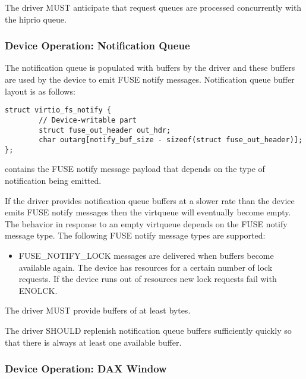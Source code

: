 The driver MUST anticipate that request queues are processed concurrently with the hiprio queue.

\subsubsection{Device Operation: Notification Queue}\label{sec:Device Types / File System Device / Device Operation / Device Operation: Notification Queue}

The notification queue is populated with buffers by the driver and these
buffers are used by the device to emit FUSE notify messages.  Notification
queue buffer layout is as follows:

\begin{lstlisting}
struct virtio_fs_notify {
        // Device-writable part
        struct fuse_out_header out_hdr;
        char outarg[notify_buf_size - sizeof(struct fuse_out_header)];
};
\end{lstlisting}

 contains the FUSE notify message payload that depends on the
type of notification being emitted.

If the driver provides notification queue buffers at a slower rate than the
device emits FUSE notify messages then the virtqueue will eventually become
empty.  The behavior in response to an empty virtqueue depends on the FUSE
notify message type.  The following FUSE notify message types are supported:
\begin{itemize}
\item FUSE\_NOTIFY\_LOCK messages are delivered when buffers become available again. The device has resources for a certain number of lock requests. If the device runs out of resources new lock requests fail with ENOLCK.
\end{itemize}


The driver MUST provide buffers of at least  bytes.

The driver SHOULD replenish notification queue buffers sufficiently quickly so
that there is always at least one available buffer.

\subsubsection{Device Operation: DAX Window}\label{sec:Device Types / File System Device / Device Operation / Device Operation: DAX Window}

